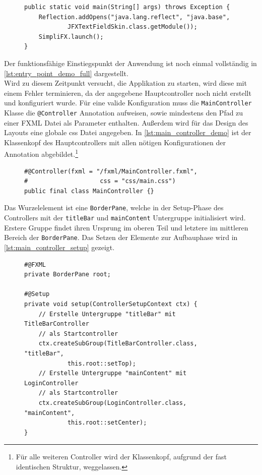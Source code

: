 \begin{figure}[H]
\begin{lstlisting}[caption=Demo -- \texttt{main} Methode, captionpos=b, label=lst:main_method_demo]
public static void main(String[] args) throws Exception {
    Reflection.addOpens("java.lang.reflect", "java.base",
			JFXTextFieldSkin.class.getModule());
    SimpliFX.launch();
}
	\end{lstlisting}
\end{figure}
\noindent Der funktionsfähige Einstiegspunkt der Anwendung ist noch einmal vollständig in \autoref{lst:entry_point_demo_full} dargestellt.\\
Wird zu diesem Zeitpunkt versucht, die Applikation zu starten, wird diese mit einem Fehler terminieren, da der angegebene Hauptcontroller noch nicht erstellt und konfiguriert wurde.
Für eine valide Konfiguration muss die \texttt{MainController} Klasse die \texttt{@Controller} Annotation aufweisen, sowie mindestens den Pfad zu einer FXML Datei als Parameter enthalten. Außerdem wird für das Design des Layouts eine globale \ac{css} Datei angegeben. In \autoref{lst:main_controller_demo} ist der Klassenkopf des Hauptcontrollers mit allen nötigen Konfigurationen der Annotation abgebildet.\footnote{Für alle weiteren Controller wird der Klassenkopf, aufgrund der fast identischen Struktur, weggelassen.}
\begin{figure}[H]
	\begin{lstlisting}[caption=Demo -- \texttt{MainController} Klassenkopf, captionpos=b, label=lst:main_controller_demo]
#@Controller(fxml = "/fxml/MainController.fxml", 
#					 css = "css/main.css")
public final class MainController {}
	\end{lstlisting}
\end{figure}
\noindent Das Wurzelelement ist eine \texttt{BorderPane}, welche in der Setup-Phase des Controllers mit der \texttt{titleBar} und \texttt{mainContent} Untergruppe initialisiert wird. Erstere Gruppe findet ihren Ursprung im oberen Teil und letztere im mittleren Bereich der \texttt{BorderPane}. Das Setzen der Elemente zur Aufbauphase wird in \autoref{lst:main_controller_setup} gezeigt.
\begin{figure}[H]
	\begin{lstlisting}[caption=Demo -- \texttt{MainController} Setup-Phase, captionpos=b, label=lst:main_controller_setup]
#@FXML
private BorderPane root;

#@Setup
private void setup(ControllerSetupContext ctx) {
	// Erstelle Untergruppe "titleBar" mit TitleBarController 
	// als Startcontroller
    ctx.createSubGroup(TitleBarController.class, "titleBar", 
			this.root::setTop);
	// Erstelle Untergruppe "mainContent" mit LoginController
	// als Startcontroller
    ctx.createSubGroup(LoginController.class, "mainContent",
			this.root::setCenter);
}
	\end{lstlisting}
\end{figure}
